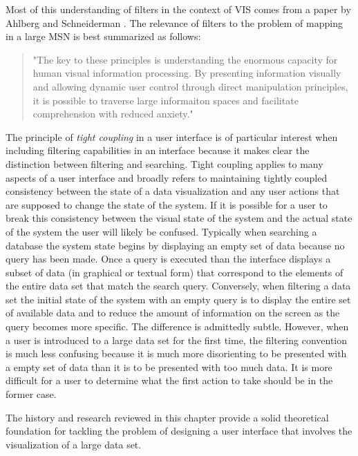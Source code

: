 Most of this understanding of filters in the context of VIS comes from a paper by Ahlberg and Schneiderman \cite{seeking1994}. The relevance of filters to the problem of mapping in a large MSN is best summarized as follows:

\begin{quote}
"The key to these principles is understanding the enormous capacity for human visual information processing. By presenting information visually and allowing dynamic user control through direct manipulation principles, it is possible to traverse large informaiton spaces and facilitate comprehension with reduced anxiety." \cite{seeking1994}
\end{quote}

The principle of \emph{tight coupling} in a user interface is of particular interest when including filtering capabilities in an interface because it makes clear the distinction between filtering and searching. Tight coupling applies to many aspects of a user interface and broadly refers to maintaining tightly coupled consistency between the state of a data visualization and any user actions that are supposed to change the state of the system. If it is possible for a user to break this consistency between the visual state of the system and the actual state of the system the user will likely be confused. Typically when searching a database the system state begins by displaying an empty set of data because no query has been made. Once a query is executed than the interface displays a subset of data (in graphical or textual form) that correspond to the elements of the entire data set that match the search query. Conversely, when filtering a data set the initial state of the system with an empty query is to display the entire set of available data and to reduce the amount of information on the screen as the query becomes more specific. The difference is admittedly subtle. However, when a user is introduced to a large data set for the first time, the filtering convention is much less confusing because it is much more disorienting to be presented with a empty set of data than it is to be presented with too much data. It is more difficult for a user to determine what the first action to take should be in the former case.

The history and research reviewed in this chapter provide a solid theoretical foundation for tackling the problem of designing a user interface that involves the visualization of a large data set.
